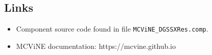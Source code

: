 \subsection*{Links}
\begin{itemize}
  \item Component source code found in file \texttt{MCViNE\_DGSSXRes.comp}.
  \item MCViNE documentation: https://mcvine.github.io
\end{itemize}
